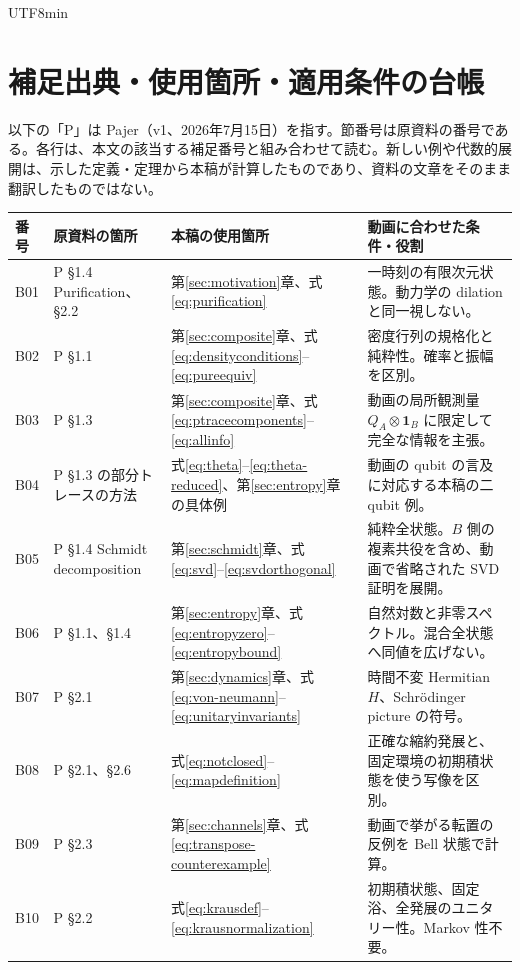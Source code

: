 \documentclass[11pt,a4paper]{article}
\numberwithin{equation}{section}
\newcommand{\I}{\mathbf{1}}
\begin{document}
\begin{CJK*}{UTF8}{min}
\section{補足出典・使用箇所・適用条件の台帳}
\label{app:ledger}
以下の「P」は Pajer\cite{pajer}（v1、2026年7月15日）を指す。節番号は原資料の番号である。各行は、本文の該当する補足番号と組み合わせて読む。新しい例や代数的展開は、示した定義・定理から本稿が計算したものであり、資料の文章をそのまま翻訳したものではない。
\begin{longtable}{p{}p{}p{}p{}}
\toprule
番号 & 原資料の箇所 & 本稿の使用箇所 & 動画に合わせた条件・役割\\\midrule\endhead
B01 & P §1.4 Purification、§2.2 & 第\ref{sec:motivation}章、式\eqref{eq:purification} & 一時刻の有限次元状態。動力学の dilation と同一視しない。\\
B02 & P §1.1 & 第\ref{sec:composite}章、式\eqref{eq:densityconditions}--\eqref{eq:pureequiv} & 密度行列の規格化と純粋性。確率と振幅を区別。\\
B03 & P §1.3 & 第\ref{sec:composite}章、式\eqref{eq:ptracecomponents}--\eqref{eq:allinfo} & 動画の局所観測量 $Q_A\otimes\I_B$ に限定して完全な情報を主張。\\
B04 & P §1.3 の部分トレースの方法 & 式\eqref{eq:theta}--\eqref{eq:theta-reduced}、第\ref{sec:entropy}章の具体例 & 動画の qubit の言及に対応する本稿の二 qubit 例。\\
B05 & P §1.4 Schmidt decomposition & 第\ref{sec:schmidt}章、式\eqref{eq:svd}--\eqref{eq:svdorthogonal} & 純粋全状態。$B$ 側の複素共役を含め、動画で省略された SVD 証明を展開。\\
B06 & P §1.1、§1.4 & 第\ref{sec:entropy}章、式\eqref{eq:entropyzero}--\eqref{eq:entropybound} & 自然対数と非零スペクトル。混合全状態へ同値を広げない。\\
B07 & P §2.1 & 第\ref{sec:dynamics}章、式\eqref{eq:von-neumann}--\eqref{eq:unitaryinvariants} & 時間不変 Hermitian $H$、Schrödinger picture の符号。\\
B08 & P §2.1、§2.6 & 式\eqref{eq:notclosed}--\eqref{eq:mapdefinition} & 正確な縮約発展と、固定環境の初期積状態を使う写像を区別。\\
B09 & P §2.3 & 第\ref{sec:channels}章、式\eqref{eq:transpose-counterexample} & 動画で挙がる転置の反例を Bell 状態で計算。\\
B10 & P §2.2 & 式\eqref{eq:krausdef}--\eqref{eq:krausnormalization} & 初期積状態、固定浴、全発展のユニタリー性。Markov 性不要。\\

\end{longtable}
\end{CJK*}
\end{document}

